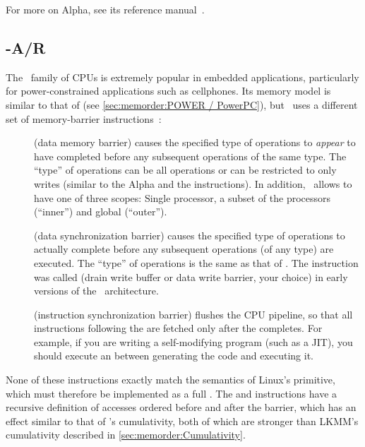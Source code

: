 For more on Alpha, see its reference manual~\cite{ALPHA2002}.

\subsection{-A/R}
\label{sec:memorder:ARMv7-A/R}

The \ARM\ family of CPUs is extremely popular in embedded applications,
particularly for power-constrained applications such as cellphones.
Its memory model is similar to that of \Power{}
(see \cref{sec:memorder:POWER / PowerPC}), but \ARM\ uses a
different set of memory-barrier instructions~\cite{ARMv7A:2010}:

\begin{description}
\item	[] (data memory barrier) causes the specified type of
	operations to \emph{appear} to have completed before any
	subsequent operations of the same type.
	The ``type'' of operations can be all operations or can be
	restricted to only writes (similar to the Alpha 
	and the \Power{}  instructions).
	In addition, \ARM\ allows  to have one of three
	scopes:
	Single processor, a subset of the processors
	(``inner'') and global (``outer'').
\item	[] (data synchronization barrier) causes the specified
	type of operations to actually complete before any subsequent
	operations (of any type) are executed.
	The ``type'' of operations is the same as that of .
	The  instruction was called  (drain write buffer
	or data write barrier, your choice) in early versions of the
	\ARM\ architecture.
\item	[] (instruction synchronization barrier) flushes the CPU
	pipeline, so that all instructions following the 
	are fetched only after the  completes.
	For example, if you are writing a self-modifying program
	(such as a JIT), you should execute an  between
	generating the code and executing it.
\end{description}

None of these instructions exactly match the semantics of Linux's
 primitive, which must therefore be implemented as a full
.
The  and  instructions have a recursive definition
of accesses ordered before and after the barrier, which has an effect
similar to that of \Power{}'s cumulativity, both of which are
stronger than LKMM's cumulativity described in
\cref{sec:memorder:Cumulativity}.


